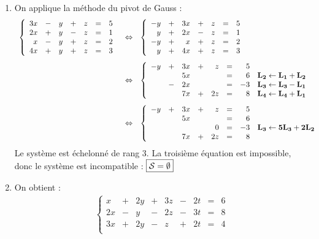 \documentclass[a4paper, 11pt,reqno]{article}
\begin{document}
\begin{correction}   \;
\begin{enumerate}
 \item 
 On applique la m\'ethode du pivot de Gauss :
 $$\begin{array}{rcl}
\left\lbrace\begin{array}{rcrcrcr}
3x &- &y &+ & z & = &5\\
2x &+ &y &- & z & = &1\\
x &- &y &+ & z & = &2\\
4x &+ &y &+ & z & = &3\\
\end{array}\right.
& \Leftrightarrow &
\left\lbrace\begin{array}{rcrcrcrl}
-y &+ &3x &+ & z & = &5\\
 y &+ &2x &- & z & = &1\\
-y &+ &x &+ & z & = &2\\
y&+ &4x &+ & z & = &3
\end{array}\right.\vsec\\
& \Leftrightarrow &
\left\lbrace\begin{array}{rcrcrcrl}
-y &+ &3x &+ & z & = &5\\
  & &5x &&  & = &6& \mathbf{L_2 \leftarrow L_1+L_2}\\
& -&2x & &  & = &-3& \mathbf{L_3 \leftarrow L_3-L_1}\\
& &7x &+ & 2z & = &8& \mathbf{L_4 \leftarrow L_4+L_1}
\end{array}\right.\vsec\\
 & \Leftrightarrow &
\left\lbrace\begin{array}{rcrcrcrl}
-y &+ &3x &+ & z & = &5\\
  & &5x &&  & = &6\\
& & & & 0 & = &-3& \mathbf{L_3 \leftarrow 5L_3+2L_2}\\
& &7x &+ & 2z & = &8
\end{array}\right.
\end{array}
$$
Le syst\`eme est \'echelonn\'e de rang 3. La troisi\`eme \'equation est impossible, donc le syst\`eme est incompatible : $\fbox{$ \mathcal{S}=\emptyset $}$
\item On obtient :
$$\begin{array}{rcl}
\left\lbrace\begin{array}{rcrcrcrcr}
x & +&2y&+&3z&-&2t&=&6\\
2x & -&y&-&2z&-&3t&=&8\\
3x & +&2y&-&z&+&2t&=&4\\

\end{array}
\end{array}$$
\end{enumerate}
\end{correction}
\end{document}
